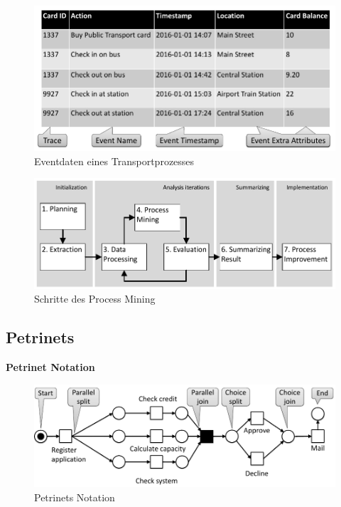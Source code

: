 \begin{figure}[H]
\includegraphics[width=14cm]{Chapters/Notizen_Graphics/TransportEventData.jpg}
\caption{Eventdaten eines Transportprozesses} 
\end{figure}

\begin{figure}[H]
\vspace*{.04\textheight}
\includegraphics[width=14cm]{Chapters/Notizen_Graphics/ProcessMiningSteps.jpg}
\caption{Schritte des Process Mining} 
\end{figure}

\subsection{Petrinets}

\textbf{Petrinet Notation}
\begin{figure}[H]

\includegraphics[width=14cm]{Chapters/Notizen_Graphics/Petri_Notation.jpg}
\caption{Petrinets Notation} 
\end{figure}

